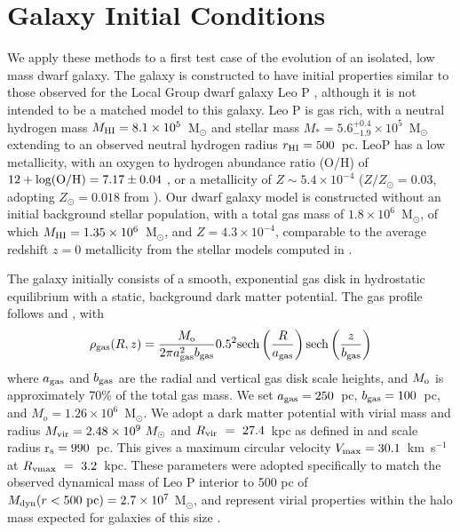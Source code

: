 \section{Galaxy Initial Conditions}
\label{ch1:sec:IC}
We apply these methods to a first test case of the evolution of an isolated, low mass dwarf galaxy. The galaxy is constructed to have initial properties similar to those observed for the Local Group dwarf galaxy Leo P \citep{Giovanelli2013,McQuinn2013,McQuinn2015a,McQuinn2015}, although it is not intended to be a matched model to this galaxy. Leo P is gas rich, with a neutral hydrogen mass $M_{\rm HI} = 8.1\times 10^{5}$~M$_{\odot}$ and stellar mass $M_{*} = 5.6^{+0.4}_{-1.9} \times 10^{5}$~M$_{\odot}$ \citep{McQuinn2015a} extending to an observed neutral hydrogen radius $r_{\rm HI} = 500$~pc. LeoP has a low metallicity, with an oxygen to hydrogen abundance ratio (O/H) of $12 + \rm{log(O/H)} = 7.17 \pm 0.04$ \citep{Skillman2013}, or a metallicity of $Z \sim 5.4\times10^{-4}$ ($Z/Z_{\odot} = 0.03$, adopting $Z_{\odot} = 0.018$ from \citet{Asplund2009}). Our dwarf galaxy model is constructed without an initial background stellar population, with a total gas mass of $1.8 \times 10^{6}$~M$_{\odot}$, of which $M_{\rm HI} = 1.35 \times 10^{6}$~M$_{\odot}$, and $Z = 4.3\times 10^{-4}$, comparable to the average redshift $z = 0$ metallicity from the stellar models computed in \citet{McQuinn2015}.

The galaxy initially consists of a smooth, exponential gas disk in hydrostatic equilibrium with a static, background dark matter potential. The gas profile follows \citet{Tonnesen2009} and \citet{Salem2015}, with
\begin{equation}
\rho_{\rm gas} (R,z) = \frac{M_{\rm o}}{2\pi a^2_{\rm gas}b_{\rm gas}} 0.5^2{\rm sech}\left(\frac{R}{a_{\rm gas}}\right){\rm sech}\left(\frac{z}{b_{\rm gas}}\right)
\end{equation}
where $a_{\rm gas}$ and $b_{\rm gas}$ are the radial and vertical gas disk scale heights, and $M_{\rm o}$ is approximately 70\% of the total gas mass. We set $a_{\rm gas} = 250$~pc, $b_{\rm gas} = 100$~pc, and $M_o = 1.26\times 10^6$~M$_{\odot}$. We adopt a \citet{Burkert1995} dark matter potential with virial mass and radius $M_{\rm vir} = 2.48\times 10^{9}~M_{\odot}$ and $R_{\rm vir}~=~27.4$~kpc as defined in \citep{BryanNorman1998} and scale radius r$_{\rm s} = 990$~pc. This gives a maximum circular velocity $V_{\rm max} = 30.1$~km~s$^{-1}$ at $R_{\rm vmax}~=~3.2$~kpc. These parameters were adopted specifically to match the observed dynamical mass of Leo P interior to 500 pc of $M_{\rm dyn} (r < 500~\rm{pc}) = 2.7\times 10^{7}$ M$_{\odot}$, and represent virial properties within the halo mass expected for galaxies of this size \citep{Ferrero2012,Read2017}.

